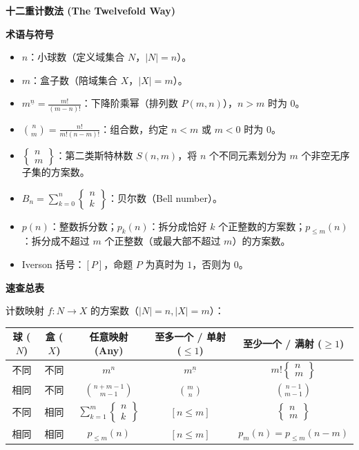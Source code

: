 \textbf{十二重计数法 (The Twelvefold Way)}

\textbf{术语与符号}
\begin{itemize}
	\item $n$：小球数（定义域集合 $N$，$|N|=n$）。
	\item $m$：盒子数（陪域集合 $X$，$|X|=m$）。
	\item $m^{\underline{n}} = \frac{m!}{(m-n)!}$：下降阶乘幂（排列数 $P(m, n)$），$n > m$ 时为 $0$。
	\item $\binom{n}{m} = \frac{n!}{m!(n-m)!}$：组合数，约定 $n < m$ 或 $m < 0$ 时为 $0$。
	\item $\left\{ \begin{matrix} n \\ m \end{matrix} \right\}$：第二类斯特林数 $S(n, m)$，将 $n$ 个不同元素划分为 $m$ 个非空无序子集的方案数。
	\item $B_n = \sum_{k=0}^n \left\{ \begin{matrix} n \\ k \end{matrix} \right\}$：贝尔数（Bell number）。
	\item $p(n)$：整数拆分数；$p_k(n)$：拆分成恰好 $k$ 个正整数的方案数；$p_{\le m}(n)$：拆分成不超过 $m$ 个正整数（或最大部不超过 $m$）的方案数。
	\item Iverson 括号：$[P]$，命题 $P$ 为真时为 $1$，否则为 $0$。
\end{itemize}

\textbf{速查总表}

计数映射 $f: N \to X$ 的方案数（$|N|=n, |X|=m$）：
\begin{center}
\begin{tabular}{|c|c|c|c|c|}
\hline
球 ($N$) & 盒 ($X$) & 任意映射 (Any) & 至多一个 / 单射 ($\le 1$) & 至少一个 / 满射 ($\ge 1$) \\
\hline
不同 & 不同 & $m^n$ & $m^{\underline{n}}$ & $m! \left\{ \begin{matrix} n \\ m \end{matrix} \right\}$ \\
\hline
相同 & 不同 & $\binom{n+m-1}{m-1}$ & $\binom{m}{n}$ & $\binom{n-1}{m-1}$ \\
\hline
不同 & 相同 & $\sum_{k=1}^m \left\{ \begin{matrix} n \\ k \end{matrix} \right\}$ & $[n \le m]$ & $\left\{ \begin{matrix} n \\ m \end{matrix} \right\}$ \\
\hline
相同 & 相同 & $p_{\le m}(n)$ & $[n \le m]$ & $p_m(n) = p_{\le m}(n-m)$ \\
\hline
\end{tabular}
\end{center}

